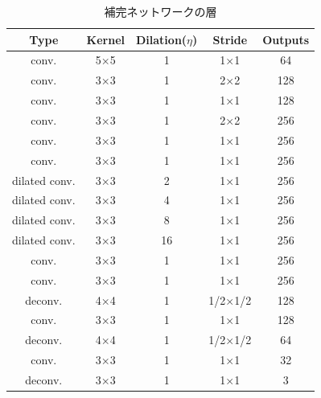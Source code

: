 \documentclass[a4j, 11pt]{jreport}
\begin{document}
\begin{table}[H]
	\caption{補完ネットワークの層}
	\label{tb:completion}
	\centering
	\begin{tabular}{ccccc}
	\hline
	Type          & Kernel & Dilation($\eta$) & Stride  & Outputs \\ \hline
	conv.         & 5×5    & 1           & 1×1     & 64      \\ \hline
	conv.         & 3×3    & 1           & 2×2     & 128     \\ 
	conv.         & 3×3    & 1           & 1×1     & 128     \\ \hline
	conv.         & 3×3    & 1           & 2×2     & 256     \\ 
	conv.         & 3×3    & 1           & 1×1     & 256     \\ 
	conv.         & 3×3    & 1           & 1×1     & 256     \\ 
	dilated conv. & 3×3    & 2           & 1×1     & 256     \\ 
	dilated conv. & 3×3    & 4           & 1×1     & 256     \\ 
	dilated conv. & 3×3    & 8           & 1×1     & 256     \\ 
	dilated conv. & 3×3    & 16          & 1×1     & 256     \\ 
	conv.         & 3×3    & 1           & 1×1     & 256     \\ 
	conv.         & 3×3    & 1           & 1×1     & 256     \\ \hline
	deconv.       & 4×4    & 1           & 1/2×1/2 & 128     \\ 
	conv.         & 3×3    & 1           & 1×1     & 128     \\ \hline
	deconv.       & 4×4    & 1           & 1/2×1/2 & 64      \\ 
	conv.         & 3×3    & 1           & 1×1     & 32      \\ 
	deconv.       & 3×3    & 1           & 1×1     & 3       \\ \hline
	\end{tabular}
	
\end{table}
\end{document}
